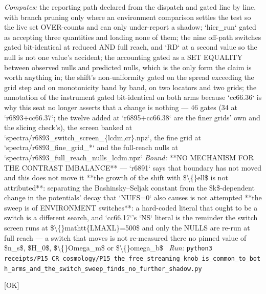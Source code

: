 \begin{description}
\emph{Computes:} the reporting path declared from the dispatch and gated line by line, with branch pruning only where an environment comparison settles the test so the live set OVER-counts and can only under-report a shadow; `hier\_run` gated as accepting three quantities and loading none of them; the nine off-path switches gated bit-identical at reduced AND full reach, and `RD` at a second value so the null is not one value's accident; the accounting gated as a SET EQUALITY between observed nulls and predicted nulls, which is the only form the claim is worth anything in; the shift's non-uniformity gated on the spread exceeding the grid step and on monotonicity band by band, on two locators and two grids; the annotation of the instrument gated bit-identical on both arms because `cc66.36` is why this seat no longer asserts that a change is nothing --- 46 gates (34 at `r6893+cc66.37`; the twelve added at `r6895+cc66.38` are the finer grids' own and the slicing check's), the screen banked at `spectra/r6893\_switch\_screen\_\{lcdm,cr\}.npz`, the fine grid at `spectra/r6893\_fine\_grid\_*` and the full-reach nulls at `spectra/r6893\_full\_reach\_nulls\_lcdm.npz`
 \emph{Bound:}  **NO MECHANISM FOR THE CONTRAST IMBALANCE** --- `r6891` says that boundary has not moved and this does not move it  **the growth of the shift with \$\textbackslash\{\}ell\$ is not attributed**: separating the Bashinsky--Seljak constant from the \$k\$-dependent change in the potentials' decay that `NUFS=0` also causes is not attempted  **the sweep is of ENVIRONMENT switches**: a hard-coded literal that ought to be a switch is a different search, and `cc66.17`'s `NS` literal is the reminder  the switch screen runs at \$\textbackslash\{\}mathtt\{LMAXL\}=500\$ and only the NULLS are re-run at full reach --- a switch that moves is not re-measured there  no pinned value of \$n\_s\$, \$H\_0\$, \$\textbackslash\{\}Omega\_m\$ or \$\textbackslash\{\}omega\_b\$
\ \emph{Run:} \texttt{python3 receipts/P15\_CR\_cosmology/P15\_the\_free\_streaming\_knob\_is\_common\_to\_both\_arms\_and\_the\_switch\_sweep\_finds\_no\_further\_shadow.py}
\item[\label{rcpt:make_fig_acoustic_two_arm}\textbf{}\quad\texttt{make\_fig\_acoustic\_two\_arm}]\hfill\textsf{[OK]}\\

\end{description}
